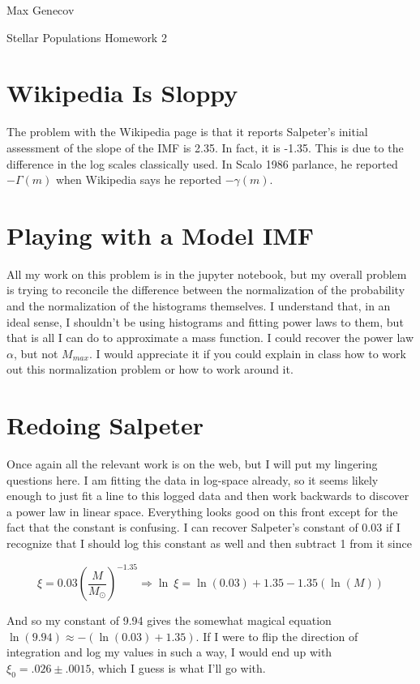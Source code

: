 \documentclass[letterpaper,12pt]{article}
\begin{document}
Max Genecov

\begin{center}
\Large Stellar Populations Homework 2 
\end{center}

\normalsize
\section{Wikipedia Is Sloppy}

The problem with the Wikipedia page is that it reports Salpeter's initial assessment of the slope of the IMF is 2.35. In fact, it is -1.35. This is due to the difference in the log scales classically used. In Scalo 1986 parlance, he reported $-\Gamma(m)$ when Wikipedia says he reported $-\gamma(m)$.

\section{Playing with a Model IMF}

All my work on this problem is in the jupyter notebook, but my overall problem is trying to reconcile the difference between the normalization of the probability and the normalization of the histograms themselves. I understand that, in an ideal sense, I shouldn't be using histograms and fitting power laws to them, but that is all I can do to approximate a mass function. I could recover the power law $\alpha$, but not $M_{max} $. I would appreciate it if you could explain in class how to work out this normalization problem or how to work around it.

\section{Redoing Salpeter}

Once again all the relevant work is on the web, but I will put my lingering questions here. I am fitting the data in log-space already, so it seems likely enough to just fit a line to this logged data and then work backwards to discover a power law in linear space. Everything looks good on this front except for the fact that the constant is confusing. I can recover Salpeter's constant of 0.03 if I recognize that I should log this constant as well and then subtract 1 from it since 

$$ \xi = 0.03 (\frac{M}{M_{\odot}})^{-1.35} \Rightarrow \ln \ \xi = \ln (0.03)+1.35 -1.35(\ln (M))$$

And so my constant of 9.94 gives the somewhat magical equation $\ln (9.94) \approx -(\ln(0.03) + 1.35) $. If I were to flip the direction of integration and log my values in such a way, I would end up with $\xi_0 = .026 \pm .0015$, which I guess is what I'll go with.
\end{document}

